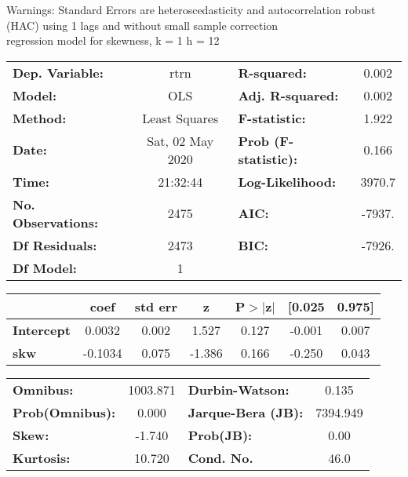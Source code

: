 Warnings: \newline
 [1] Standard Errors are heteroscedasticity and autocorrelation robust (HAC) using 1 lags and without small sample correction\\ 

regression model for skewness, k = 1 h = 12\begin{center}
\begin{tabular}{lclc}
\toprule
\textbf{Dep. Variable:}    &       rtrn       & \textbf{  R-squared:         } &     0.002   \\
\textbf{Model:}            &       OLS        & \textbf{  Adj. R-squared:    } &     0.002   \\
\textbf{Method:}           &  Least Squares   & \textbf{  F-statistic:       } &     1.922   \\
\textbf{Date:}             & Sat, 02 May 2020 & \textbf{  Prob (F-statistic):} &    0.166    \\
\textbf{Time:}             &     21:32:44     & \textbf{  Log-Likelihood:    } &    3970.7   \\
\textbf{No. Observations:} &        2475      & \textbf{  AIC:               } &    -7937.   \\
\textbf{Df Residuals:}     &        2473      & \textbf{  BIC:               } &    -7926.   \\
\textbf{Df Model:}         &           1      & \textbf{                     } &             \\
\bottomrule
\end{tabular}
\begin{tabular}{lcccccc}
                   & \textbf{coef} & \textbf{std err} & \textbf{z} & \textbf{P$> |$z$|$} & \textbf{[0.025} & \textbf{0.975]}  \\
\midrule
\textbf{Intercept} &       0.0032  &        0.002     &     1.527  &         0.127        &       -0.001    &        0.007     \\
\textbf{skw}       &      -0.1034  &        0.075     &    -1.386  &         0.166        &       -0.250    &        0.043     \\
\bottomrule
\end{tabular}
\begin{tabular}{lclc}
\textbf{Omnibus:}       & 1003.871 & \textbf{  Durbin-Watson:     } &    0.135  \\
\textbf{Prob(Omnibus):} &   0.000  & \textbf{  Jarque-Bera (JB):  } & 7394.949  \\
\textbf{Skew:}          &  -1.740  & \textbf{  Prob(JB):          } &     0.00  \\
\textbf{Kurtosis:}      &  10.720  & \textbf{  Cond. No.          } &     46.0  \\
\bottomrule
\end{tabular}
\end{center}

